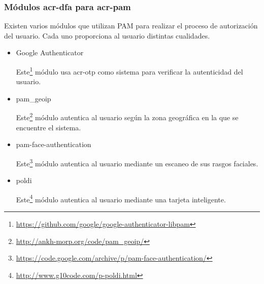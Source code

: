 \documentclass[twoside, titlepage, 12pt, a4paper]{article}
\begin{document}
{\subsubsection{Módulos \gls{acr-dfa} para \gls{acr-pam}}
Existen varios módulos que utilizan PAM para realizar el proceso de autorización del usuario. Cada uno proporciona al usuario distintas cualidades.
\begin{itemize}
	\item{Google Authenticator}\par
	Este\footnote{\url{https://github.com/google/google-authenticator-libpam}} módulo usa \gls{acr-otp} como sistema para verificar la autenticidad del usuario.
	\item{pam\_geoip}\par
	Este\footnote{\url{http://ankh-morp.org/code/pam_geoip/}} módulo autentica al usuario según la zona geográfica en la que se encuentre el sistema.
	\item{pam-face-authentication} \par
	Este\footnote{\url{https://code.google.com/archive/p/pam-face-authentication/}} módulo autentica al usuario mediante un escaneo de sus rasgos faciales.
	\item{poldi} \par
	Este\footnote{\url{http://www.g10code.com/p-poldi.html}} módulo autentica al usuario mediante una tarjeta inteligente.
\end{itemize}
}
\end{document}
